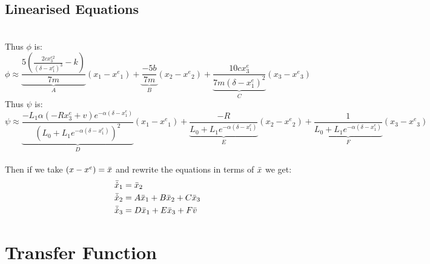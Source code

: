\subsection*{Linearised Equations
}\hfill \\
Thus $\phi $ is:
\begin{equation}
    \phi \approx \underbrace{\frac{5 \left(\frac{2 c x_{3}^{e2}}{\left(\delta - x_{1}^e\right)^{3}} - k\right)}{7 m}}_A(x_1 - {x^e}_1) + \underbrace{\frac{-5 b}{7 m}}_B(x_2 - {x^e}_2) +  \underbrace{\frac{10 c x_{3}^e}{7 m \left(\delta - x_{1}^e\right)^{2}}}_C (x_3 - {x^e}_3)
\end{equation}
Thus $\psi $ is:
\\
\begin{equation}
    \psi \approx \underbrace{ \frac{-L_{1} \alpha \left(- R x_{3}^e + v\right) e^{- \alpha \left(\delta - x_{1}^e\right)}}{\left(L_{0} + L_{1} e^{- \alpha \left(\delta - x_{1}^e\right)}\right)^{2}}}_D(x_1 - {x^e}_1) + \underbrace{ \frac{-R}{L_{0} + L_{1} e^{- \alpha \left(\delta - x_{1}^e\right)}}}_E(x_2 - {x^e}_2) + \underbrace{\frac{1}{L_{0} + L_{1} e^{- \alpha \left(\delta - x_{1}^e\right)}}}_F (x_3 - {x^e}_3)
\end{equation}
\\
Then if we take $(x - x^e) = \Bar{x} $ and rewrite the equations in terms of $\Bar{x} $ we get:
\begin{align}
    \Bar{\Dot{x}}_1 &= \Bar{x}_2
    \\
    \Bar{\Dot{x}}_2 &= A\Bar{x}_1 + 
    B\Bar{x}_2 + C\Bar{x}_3
    \\
    \Bar{\Dot{x}}_3 &= D\Bar{x}_1 + 
    E\Bar{x}_3 + F\Bar{v}
\end{align}
\section{Transfer Function}